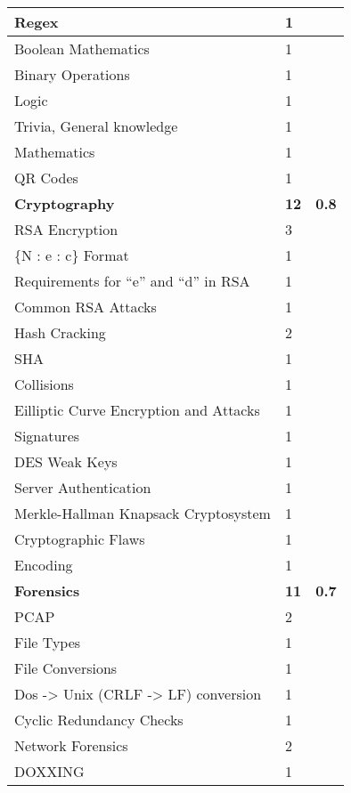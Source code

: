 \documentclass[twoside,a4paper,11pt]{report}
\begin{document}
\begin{center}
\begin{longtable}{| l | l | l |}
					\quad Regex & 1 & \\ \hline 
					\quad Boolean Mathematics & 1 & \\ \hline 
					\quad Binary Operations & 1 & \\ \hline 
					\quad Logic & 1 & \\ \hline 
					\quad Trivia, General knowledge & 1 & \\ \hline 
					\quad Mathematics & 1 & \\ \hline 
					\quad QR Codes & 1 & \\ \hline 
					\textbf{Cryptography} & \textbf{12} & \textbf{0.8} \\ \hline 
					\quad RSA Encryption & 3 & \\ \hline
						\qquad \{N : e : c\} Format & 1 & \\ \hline
						\qquad Requirements for ``e'' and ``d'' in RSA & 1 & \\ \hline
						\qquad Common RSA Attacks & 1 & \\ \hline 
					\quad Hash Cracking & 2 & \\ \hline
						\qquad SHA & 1 & \\ \hline 
						\qquad Collisions & 1 & \\ \hline 
					\quad Eilliptic Curve Encryption and Attacks & 1 & \\ \hline 
					\quad Signatures & 1 & \\ \hline 
					\quad DES Weak Keys & 1 & \\ \hline 
					\quad Server Authentication & 1 & \\ \hline
					\quad Merkle-Hallman Knapsack Cryptosystem & 1 & \\ \hline
					\quad Cryptographic Flaws & 1 & \\ \hline 
					\quad Encoding & 1 & \\ \hline 
					\newpage
					\textbf{Forensics} & \textbf{11} & \textbf{0.7}\\ \hline
					\quad PCAP & 2 & \\ \hline
					\quad File Types & 1 & \\ \hline
					\quad File Conversions & 1 & \\ \hline 
					\quad Dos -> Unix (CRLF -> LF) conversion & 1 & \\ \hline 
					\quad Cyclic Redundancy Checks & 1 & \\ \hline
					\quad Network Forensics & 2 & \\ \hline 
					\quad DOXXING & 1 & \\ \hline 

\end{longtable}
\end{center}
\end{document}
